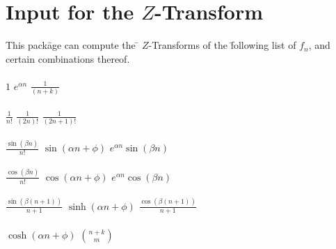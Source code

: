 \section{Input for the $Z$-Transform}
\begin{tabbing}
  This pack\=age can compute the \= $Z$-Transforms of the \=following 
  list of $f_n$, and \\ certain combinations thereof.\\ \\

\>$1$                             
\>$e^{\alpha n}$                  
\>$\frac{1}{(n+k)}$               \\ \\
\>$\frac{1}{n!}$                  
\>$\frac{1}{(2n)!}$               
\>$\frac{1}{(2n+1)!}$             \\ \\
\>$\frac{\sin(\beta n)}{n!}$      
\>$\sin(\alpha n+\phi)$           
\>$e^{\alpha n} \sin(\beta n)$    \\ \\
\>$\frac{\cos(\beta n)}{n!}$      
\>$\cos(\alpha n+\phi)$           
\>$e^{\alpha n} \cos(\beta n)$    \\ \\
\>$\frac{\sin(\beta (n+1))}{n+1}$ 
\>$\sinh(\alpha n+\phi)$          
\>$\frac{\cos(\beta (n+1))}{n+1}$ \\ \\
\>$\cosh(\alpha n+\phi)$          
\>${n+k \choose m}$\\
\end{tabbing}

